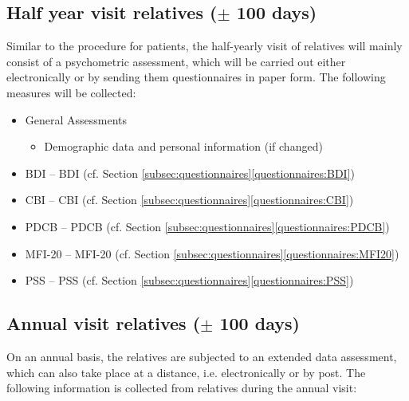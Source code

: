\subsection{Half year visit relatives ($\pm$ 100 days)}
Similar to the procedure for patients, the half-yearly visit of relatives will mainly consist of a psychometric assessment, which will be carried out either electronically or by sending them questionnaires in paper form. The following measures will be collected:

\begin{itemize}[noitemsep,topsep=0pt]
\item General Assessments
\begin{itemize}[noitemsep,topsep=0pt]
\item Demographic data and personal information (if changed)
\end{itemize}
\item \acl{BDI} -- \acs{BDI} (cf. Section \ref{subsec:questionnaires}\ref{questionnaires:BDI})
\item \acl{CBI} -- \acs{CBI} (cf. Section \ref{subsec:questionnaires}\ref{questionnaires:CBI})
\item \acl{PDCB} -- \acs{PDCB} (cf. Section \ref{subsec:questionnaires}\ref{questionnaires:PDCB})
\item \acl{MFI-20} -- \acs{MFI-20} (cf. Section \ref{subsec:questionnaires}\ref{questionnaires:MFI20})
\item \acl{PSS} -- \acs{PSS} (cf. Section \ref{subsec:questionnaires}\ref{questionnaires:PSS})
\end{itemize}

\subsection{Annual visit relatives ($\pm$ 100 days)}
On an annual basis, the relatives are subjected to an extended data assessment, which can also take place at a distance, i.e. electronically or by post. The following information is collected from relatives during the annual visit:

